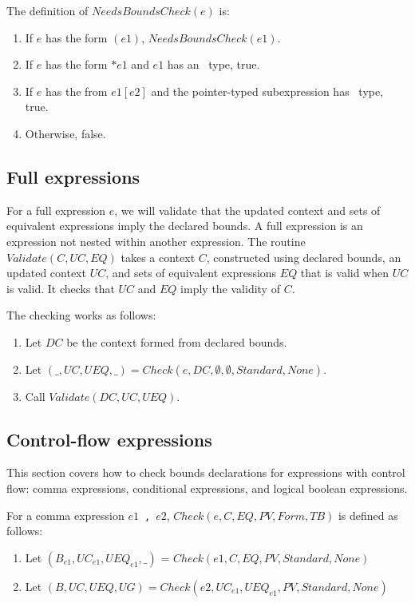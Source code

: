 The definition of $NeedsBoundsCheck(e)$ is:
\begin{enumerate}
\item If $e$ has the form $(e1)$, $NeedsBoundsCheck(e1).$
\item If $e$ has the form $*e1$ and $e1$ has an \arrayptr\ type, true.
\item If $e$ has the from $e1[e2]$ and the pointer-typed subexpression has \arrayptr\ type, true.
\item Otherwise, false.
\end{enumerate}


\subsection{Full expressions}

For a full expression $e$, we will validate that the updated context
and sets of equivalent expressions imply the declared bounds.
A full expression \cite[Annex C]{ISO2011} is an expression not nested within another expression.
The routine $Validate(C, UC, EQ)$ takes a context $C$,
constructed using declared bounds, an updated context $UC$, and sets of equivalent expressions $EQ$
that is valid when $UC$ is valid.  It checks that $UC$ and $EQ$ imply the validity of $C$.

The checking works as follows:
\begin{enumerate}
\item Let $DC$ be the context formed from declared bounds.
\item Let $(\_, UC, UEQ, \_) = Check(e, DC, \emptyset, \emptyset, Standard, None)$.
\item Call $Validate(DC, UC, UEQ)$.
\end{enumerate}

\subsection{Control-flow expressions}

This section covers how to check bounds declarations for expressions
with control flow: comma expressions, conditional expressions, and 
logical boolean expressions.

For a comma expression $e1$~\lstinline|,|~$e2$, $Check(e, C, EQ, PV, Form, TB)$ is defined as follows:
\begin{enumerate}
\item Let $(B_{e1}, {UC}_{e1}, {UEQ}_{e1}, \_)$ = $Check(e1, C, EQ, PV, Standard, None)$
\item Let $(B, UC, UEQ, UG) = Check(e2, {UC}_{e1}, {UEQ}_{e1}, PV, Standard, None)$
\end{enumerate}

